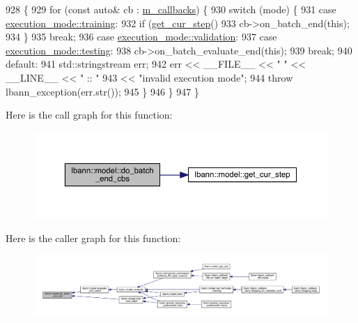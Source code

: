 \begin{DoxyCode}
928                                                 \{
929   \textcolor{keywordflow}{for} (\textcolor{keyword}{const} \textcolor{keyword}{auto}& cb : \hyperlink{classlbann_1_1model_a07b511fef30368494c2ad80922ffd0eb}{m\_callbacks}) \{
930     \textcolor{keywordflow}{switch} (mode) \{
931     \textcolor{keywordflow}{case} \hyperlink{base_8hpp_a2781a159088df64ed7d47cc91c4dc0a8ac185ddac8b5a8f5aa23c5b80bc12d214}{execution\_mode::training}:
932       \textcolor{keywordflow}{if} (\hyperlink{classlbann_1_1model_ad0cdcba177434b52dc9c4a97be183a92}{get\_cur\_step}() %
933         cb->on\_batch\_end(\textcolor{keyword}{this});
934       \}
935       \textcolor{keywordflow}{break};
936     \textcolor{keywordflow}{case} \hyperlink{base_8hpp_a2781a159088df64ed7d47cc91c4dc0a8aa617908b172c473cb8e8cda059e55bf0}{execution\_mode::validation}:
937     \textcolor{keywordflow}{case} \hyperlink{base_8hpp_a2781a159088df64ed7d47cc91c4dc0a8aae2b1fca515949e5d54fb22b8ed95575}{execution\_mode::testing}:
938       cb->on\_batch\_evaluate\_end(\textcolor{keyword}{this});
939       \textcolor{keywordflow}{break};
940     \textcolor{keywordflow}{default}:
941       std::stringstream err;
942       err << \_\_FILE\_\_ << \textcolor{stringliteral}{" "} << \_\_LINE\_\_ << \textcolor{stringliteral}{" :: "}
943           << \textcolor{stringliteral}{"invalid execution mode"};
944       \textcolor{keywordflow}{throw} lbann\_exception(err.str());
945     \}
946   \}
947 \}
\end{DoxyCode}
Here is the call graph for this function\+:\nopagebreak
\begin{figure}[H]
\begin{center}
\leavevmode
\includegraphics[width=350pt]{classlbann_1_1model_a3dc29e9751a53afda7e171aff335273e_cgraph}
\end{center}
\end{figure}
Here is the caller graph for this function\+:\nopagebreak
\begin{figure}[H]
\begin{center}
\leavevmode
\includegraphics[width=350pt]{classlbann_1_1model_a3dc29e9751a53afda7e171aff335273e_icgraph}
\end{center}
\end{figure}
